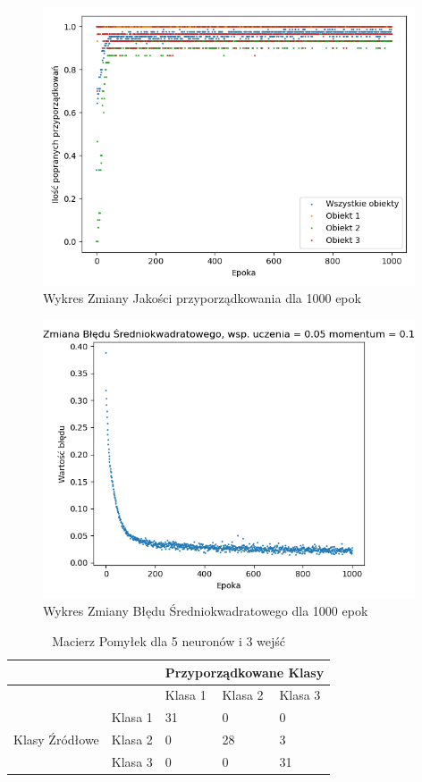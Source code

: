 \documentclass[12pt]{article}
\begin{document}
\newpage

\begin{figure}[!ht]
 \centering
 \includegraphics[width=11cm]{WykresPrzyporzadkowania5neuron3wejscia4.png}
 \caption{Wykres Zmiany Jakości przyporządkowania dla 1000 epok}
 \vspace{-0.1cm}
 \label{WykresPrzyp8}
\end{figure}


\begin{figure}[!ht]
 \centering
 \includegraphics[width=11cm]{WykresBlad5neuron3wejscia4.png}
 \caption{Wykres Zmiany Błędu Średniokwadratowego dla 1000 epok}
 \vspace{-0.1cm}
 \label{WykresBlad8}
\end{figure}
\newpage 

\begin{table}
\caption{\label{tab:tablica7} Macierz Pomyłek dla 5 neuronów i 3 wejść }
\begin{tabular}{ |p{3cm}|p{3cm}|p{2cm}|p{2cm}|p{2cm}|  }
 \hline
 & & 
 \multicolumn{3}{|c|}{Przyporządkowane Klasy} \\
 \hline

   & & Klasa 1 & Klasa 2 & Klasa 3\\
 \hline
\multirow{3}{4em}{Klasy Źródłowe}
   & Klasa 1 & 31 & 0 & 0 \\ 
   & Klasa 2 & 0 & 28 & 3 \\
   & Klasa 3 & 0 & 0 & 31 \\

 \hline
\end{tabular}
\end{table}
\end{document}
